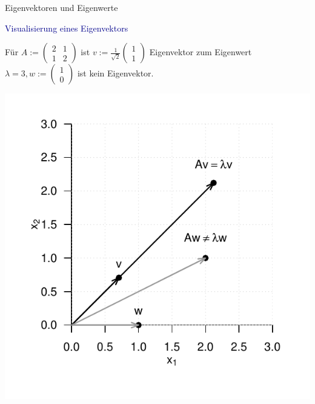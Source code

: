 \documentclass[
  8pt,
  ignorenonframetext,
]{beamer}
\begin{document}
\begin{frame}[t]{Eigenvektoren und Eigenwerte}
\protect\hypertarget{eigenvektoren-und-eigenwerte-2}{}
\vspace{1mm}

\textcolor{darkblue}{Visualisierung eines Eigenvektors} \footnotesize
\center

Für \(A := \begin{pmatrix} 2 & 1 \\ 1 & 2 \end{pmatrix}\) ist
\(v := \frac{1}{\sqrt{2}} \begin{pmatrix} 1 \\ 1 \end{pmatrix}\)
Eigenvektor zum Eigenwert
\(\lambda = 3, w := \begin{pmatrix} 1 \\ 0 \end{pmatrix}\) ist kein
Eigenvektor.

\begin{center}\includegraphics[width=0.55\linewidth]{4_Abbildungen/mvda_4_eigenvektor} \end{center}
\end{frame}
\end{document}
